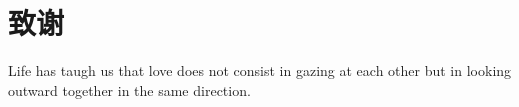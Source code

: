 \chapter*{致谢}

Life has taugh us that love does not consist in gazing at each other but in
looking outward together in the same direction.




